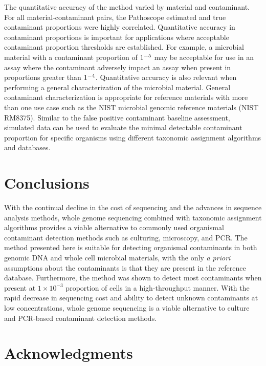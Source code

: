 \documentclass[fleqn,10pt,lineno]{wlpeerj}\usepackage[]{graphicx}\usepackage[]{color}
\begin{document}
The quantitative accuracy of the method varied by material and contaminant. 
For all material-contaminant pairs, the Pathoscope estimated and true contaminant proportions were highly correlated. 
Quantitative accuracy in contaminant proportions is important for applications where acceptable contaminant proportion thresholds are established. 
For example, a microbial material with a contaminant proportion of $1 \time 10^{-5}$ may be acceptable for use in an assay where the contaminant adversely impact an assay when present in proportions greater than $1 \time 10^{-4}$. 
Quantitative accuracy is also relevant when performing a general characterization of the microbial material. 
General contaminant characterization is appropriate for reference materials with more than one use case such as the NIST microbial genomic reference materials (NIST RM8375)\citep{olson2016pepr}.  
Similar to the false positive contaminant baseline assessment, 
simulated data can be used to evaluate the minimal detectable contaminant proportion for specific organisms using different taxonomic assignment algorithms and databases. 

\section*{Conclusions}
With the continual decline in the cost of sequencing and the advances in sequence analysis methods, whole genome sequencing combined with taxonomic assignment algorithms provides a viable alternative to commonly used organismal contaminant detection methods such as culturing, microscopy, and PCR. 
The method presented here is suitable for detecting organismal contaminants in both genomic DNA and whole cell microbial materials, with the only \textit{a priori} assumptions about the contaminants is that they are present in the reference database. 
Furthermore, the method was shown to detect most contaminants when present at $1 \times 10^{-3}$ proportion of cells in a high-throughput manner. 
With the rapid decrease in sequencing cost and ability to detect unknown contaminants at low concentrations, whole genome sequencing is a viable alternative to culture and PCR-based contaminant detection methods. 

\newpage

\section*{Acknowledgments}
\end{document}
